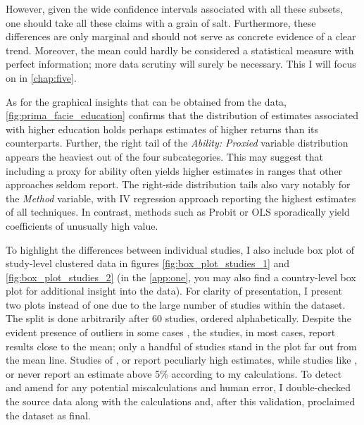 However, given the wide confidence intervals associated with all these subsets, one should take all these claims with a grain of salt. Furthermore, these differences are only marginal and should not serve as concrete evidence of a clear trend. Moreover, the mean could hardly be considered a statistical measure with perfect information; more data scrutiny will surely be necessary. This I will focus on in \autoref{chap:five}.

As for the graphical insights that can be obtained from the data, \autoref{fig:prima_facie_education} confirms that the distribution of estimates associated with higher education holds perhaps estimates of higher returns than its counterparts. Further, the right tail of the \textit{Ability: Proxied} variable distribution appears the heaviest out of the four subcategories. This may suggest that including a proxy for ability often yields higher estimates in ranges that other approaches seldom report. The right-side distribution tails also vary notably for the \textit{Method} variable, with \ac{IV} regression approach reporting the highest estimates of all techniques. In contrast, methods such as Probit or \ac{OLS} sporadically yield coefficients of unusually high value.

To highlight the differences between individual studies, I also include box plot of study-level clustered data in figures \ref{fig:box_plot_studies_1} and \ref{fig:box_plot_studies_2} (in the \autoref{app:one}, you may also find a country-level box plot for additional insight into the data). For clarity of presentation, I present two plots instead of one due to the large number of studies within the dataset. The split is done arbitrarily after 60 studies, ordered alphabetically. Despite the evident presence of outliers in some cases \citep{asadullah2006returns, harmon2002returns}, the studies, in most cases, report results close to the mean; only a handful of studies stand in the plot far out from the mean line. Studies of \cite{depken2019returns, girma2005heterogeneity}, or \cite{mphuka2012estimating} report peculiarly high estimates, while studies like \cite{angrist1995economic, li2007effect}, or \cite{webbink2004returns} never report an estimate above 5\% according to my calculations. To detect and amend for any potential miscalculations and human error, I double-checked the source data along with the calculations and, after this validation, proclaimed the dataset as final. 

